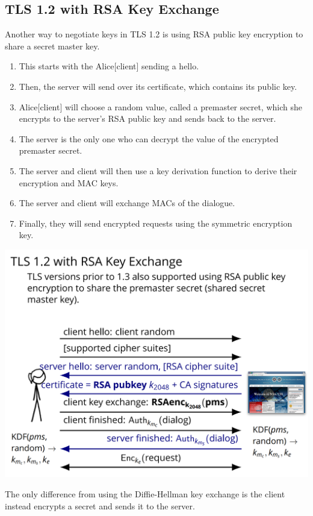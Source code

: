 \documentclass[11pt]{article} %
\begin{document}
{\subsection{TLS 1.2 with RSA Key Exchange}
Another way to negotiate keys in TLS 1.2 is using RSA public key encryption to 
share a secret master key.

\begin{enumerate}
  \item This starts with the Alice[client] sending a hello.
  \item Then, the server will send over its certificate, which contains its 
  public key.
  \item Alice[client] will choose a random value, called a premaster secret, 
  which she encrypts to the server's RSA public key and sends back to the 
  server.
  \item The server is the only one who can decrypt the value of the encrypted 
  premaster secret.
  \item The server and client will then use a key derivation function to 
  derive their encryption and MAC keys.
  \item The server and client will exchange MACs of the dialogue.
  \item Finally, they will send encrypted requests using the symmetric 
  encryption key.
\end{enumerate}

\includegraphics[scale=.6]{./TLS_RSA.png}

The only difference from using the Diffie-Hellman key exchange is the client 
instead encrypts a secret and sends it to the server.

}
\end{document}
